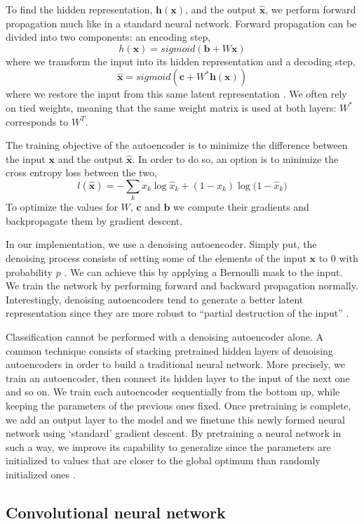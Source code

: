 \documentclass{acm_proc_article-sp}
\begin{document}
To find the hidden representation, $\mathbf{h}(\mathbf{x})$, and the output $\mathbf{\hat{x}}$, we perform forward propagation much like in a standard neural network. Forward propagation can be divided into two components: an encoding step,
$$h(\mathbf{x}) = sigmoid(\mathbf{b} + W\mathbf{x} ) $$
where we transform the input into its hidden representation and a decoding step,
$$\mathbf{\hat{x}} = sigmoid(\mathbf{c} + W^*\mathbf{h}(\mathbf{x}) ) $$
where we restore the input from this same latent representation \cite{larochelle}. We often rely on tied weights, meaning that the same weight matrix is used at both layers: $W^*$ corresponds to $W^T$.

The training objective of the autoencoder is to minimize the difference between the input $\mathbf{x}$ and the output $\mathbf{\hat{x}}$. In order to do so, an option is to minimize the cross entropy loss between the two,
$$l(\mathbf{\hat{x}}) = -\sum_k{x_k \log{\hat{x}_k} + (1-x_k)\log{(1-\hat{x}_k})} $$
To optimize the values for $W$, $\mathbf{c}$ and $\mathbf{ b}$ we compute their gradients and backpropagate them by gradient descent.

In our implementation, we use a denoising autoencoder. Simply put, the denoising process consists of setting some of the elements of the input $\mathbf{x}$ to $0$ with probability $p$  \cite{vincent2008}. We can achieve this by applying a Bernoulli mask to the input. We train the network by performing forward and backward propagation normally. Interestingly, denoising autoencoders tend to generate a better latent representation since they are more robust to ``partial destruction of the input'' \cite{vincent2008}. 

Classification cannot be performed with a denoising autoencoder alone. A common technique consists of stacking pretrained hidden layers of denoising autoencoders in order to build a traditional neural network. More precisely, we train an autoencoder, then connect its hidden layer to the input of the next one and so on. We train each autoencoder sequentially from the bottom up, while keeping the parameters of the previous ones fixed. Once pretraining is complete, we add an output layer to the model and we finetune this newly formed neural network using `standard' gradient descent. By pretraining a neural network in such a way, we improve its capability to generalize since the parameters are initialized to values that are closer to the global optimum than randomly initialized ones \cite{vincent2010}. 

\subsection{Convolutional neural network}
\end{document}
